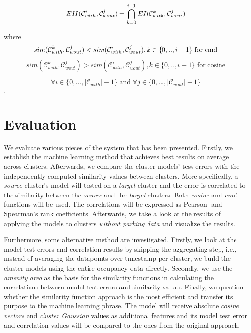 	\begin{equation}
	EII(\mathcal{C}_{with}^i,\mathcal{C}_{wout}^j) = \bigcap_{k=0}^{i-1} EI(\mathcal{C}_{with}^k,\mathcal{C}_{wout}^j) \\
	\end{equation}
	
	where
	\begin{equation}
	sim(\mathcal{C}_{with}^k,\mathcal{C}_{wout}^j) < sim(\mathcal{C}_{with}^i,\mathcal{C}_{wout}^j), k \in \{0,..,i - 1\} \text{ for emd}\\
	\end{equation}
	\begin{equation}
	sim(\mathcal{C}_{with}^k,\mathcal{C}_{wout}^j) > sim(\mathcal{C}_{with}^i,\mathcal{C}_{wout}^j), k \in \{0,..,i - 1\} \text{ for cosine} 
	\end{equation}
	
	$$\forall i \in \{0,...,|\mathcal{C}_{with}|-1\} \text{ and } \forall j \in \{0,...,|\mathcal{C}_{wout}|-1\}$$.
		
	\section{Evaluation}
	We evaluate various pieces of the system that has been presented. Firstly, we  establish the machine learning method that achieves best results on average across clusters. Afterwards, we compare the cluster models' test errors with the independently-computed similarity values between clusters. More specifically, a \textit{source} cluster's model will tested on a \textit{target} cluster and the error is correlated to the similarity between the \textit{source} and the \textit{target} clusters. Both \textit{cosine} and \textit{emd} functions will be used. The correlations will be expressed as Pearson- and Spearman's rank coefficients. Afterwards, we take a look at the results of applying the models to clusters \textit{without parking data} and visualize the results. 
	
	Furthermore, some alternative method are investigated. Firstly, we look at the model test errors and correlation results by skipping the aggregating step, i.e., instead of averaging the datapoints over timestamp per cluster, we build the cluster models using the entire occupancy data directly. Secondly, we use the \textit{amenity area} as the basis for the similarity functions in calculating the correlations between model test errors and similarity values. Finally, we question whether the similarity function approach is the most efficient and transfer its purpose to the machine learning phrase. The model will receive absolute \textit{cosine vectors} and \textit{cluster Gaussian} values as additional features and its model test error and correlation values will be compared to the ones from the original approach.
	
